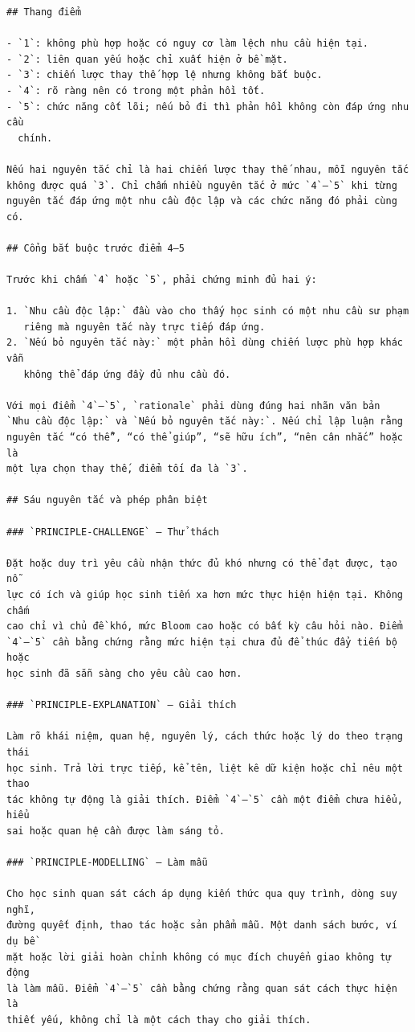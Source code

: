 \documentclass[conference]{IEEEtran}
\begin{document}
\begin{Verbatim}[breaklines=true,breakanywhere=true,fontsize=\scriptsize,formatcom=\rmfamily]
## Thang điểm

- `1`: không phù hợp hoặc có nguy cơ làm lệch nhu cầu hiện tại.
- `2`: liên quan yếu hoặc chỉ xuất hiện ở bề mặt.
- `3`: chiến lược thay thế hợp lệ nhưng không bắt buộc.
- `4`: rõ ràng nên có trong một phản hồi tốt.
- `5`: chức năng cốt lõi; nếu bỏ đi thì phản hồi không còn đáp ứng nhu cầu
  chính.

Nếu hai nguyên tắc chỉ là hai chiến lược thay thế nhau, mỗi nguyên tắc
không được quá `3`. Chỉ chấm nhiều nguyên tắc ở mức `4`–`5` khi từng
nguyên tắc đáp ứng một nhu cầu độc lập và các chức năng đó phải cùng có.

## Cổng bắt buộc trước điểm 4–5

Trước khi chấm `4` hoặc `5`, phải chứng minh đủ hai ý:

1. `Nhu cầu độc lập:` đầu vào cho thấy học sinh có một nhu cầu sư phạm
   riêng mà nguyên tắc này trực tiếp đáp ứng.
2. `Nếu bỏ nguyên tắc này:` một phản hồi dùng chiến lược phù hợp khác vẫn
   không thể đáp ứng đầy đủ nhu cầu đó.

Với mọi điểm `4`–`5`, `rationale` phải dùng đúng hai nhãn văn bản
`Nhu cầu độc lập:` và `Nếu bỏ nguyên tắc này:`. Nếu chỉ lập luận rằng
nguyên tắc “có thể”, “có thể giúp”, “sẽ hữu ích”, “nên cân nhắc” hoặc là
một lựa chọn thay thế, điểm tối đa là `3`.

## Sáu nguyên tắc và phép phân biệt

### `PRINCIPLE-CHALLENGE` — Thử thách

Đặt hoặc duy trì yêu cầu nhận thức đủ khó nhưng có thể đạt được, tạo nỗ
lực có ích và giúp học sinh tiến xa hơn mức thực hiện hiện tại. Không chấm
cao chỉ vì chủ đề khó, mức Bloom cao hoặc có bất kỳ câu hỏi nào. Điểm
`4`–`5` cần bằng chứng rằng mức hiện tại chưa đủ để thúc đẩy tiến bộ hoặc
học sinh đã sẵn sàng cho yêu cầu cao hơn.

### `PRINCIPLE-EXPLANATION` — Giải thích

Làm rõ khái niệm, quan hệ, nguyên lý, cách thức hoặc lý do theo trạng thái
học sinh. Trả lời trực tiếp, kể tên, liệt kê dữ kiện hoặc chỉ nêu một thao
tác không tự động là giải thích. Điểm `4`–`5` cần một điểm chưa hiểu, hiểu
sai hoặc quan hệ cần được làm sáng tỏ.

### `PRINCIPLE-MODELLING` — Làm mẫu

Cho học sinh quan sát cách áp dụng kiến thức qua quy trình, dòng suy nghĩ,
đường quyết định, thao tác hoặc sản phẩm mẫu. Một danh sách bước, ví dụ bề
mặt hoặc lời giải hoàn chỉnh không có mục đích chuyển giao không tự động
là làm mẫu. Điểm `4`–`5` cần bằng chứng rằng quan sát cách thực hiện là
thiết yếu, không chỉ là một cách thay cho giải thích.


\end{Verbatim}
\end{document}
